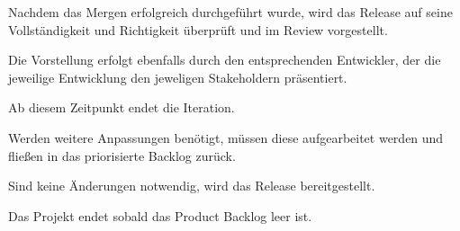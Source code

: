 Nachdem das Mergen erfolgreich durchgeführt wurde, wird das Release auf seine Vollständigkeit und Richtigkeit überprüft und im Review vorgestellt. 

Die Vorstellung erfolgt ebenfalls durch den entsprechenden Entwickler, der die jeweilige Entwicklung den jeweligen Stakeholdern präsentiert. 

Ab diesem Zeitpunkt endet die Iteration. 

Werden weitere Anpassungen benötigt, müssen diese aufgearbeitet werden und fließen in das priorisierte Backlog zurück.

Sind keine Änderungen notwendig, wird das Release bereitgestellt. 

Das Projekt endet sobald das Product Backlog leer ist.









